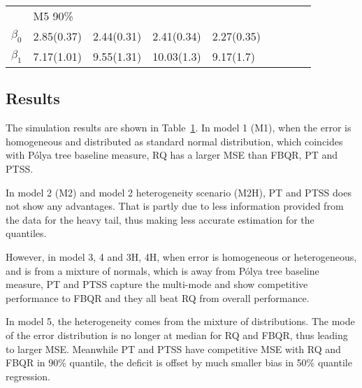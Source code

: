 \documentclass[12pt]{article}
\newcommand{\polya}{P\'{o}lya}
\begin{document}
\begin{center}
\begin{table}[h]
\begin{tabular}[tb]{cllllllll}
          & M5 90\%     &             &             &             &             &             &             &             \\
$\beta_0$ & 2.85(0.37)  & 2.44(0.31)  & 2.41(0.34)  & 2.27(0.35)  &             &             &             &             \\
$\beta_1$ & 7.17(1.01)  & 9.55(1.31)  & 10.03(1.3)  & 9.17(1.7)   &             &             &             &             \\
\hline
    \end{tabular}
    \label{ch2:tab:m1}
  \end{table}
\end{center}

\subsection{Results}
The simulation results are shown in Table~\ref{ch2:tab:m1}.
In model 1 (M1), when the error is homogeneous and distributed as standard normal distribution, which coincides with \polya{} tree baseline measure, RQ has a larger MSE than FBQR, PT and PTSS.

In model 2 (M2) and model 2 heterogeneity scenario (M2H), PT and PTSS does not show any advantages.
That is partly due to less information provided from the data for the heavy tail, thus making less accurate estimation for the quantiles.

However, in model 3, 4 and 3H, 4H, when error is homogeneous or heterogeneous, and is from a mixture of normals, which is away from \polya{} tree baseline measure,
PT and PTSS capture the multi-mode and show competitive performance to FBQR and they all beat RQ from overall performance.

In model 5, the heterogeneity comes from the mixture of distributions.
The mode of the error distribution is no longer at median for RQ and FBQR, thus leading to larger MSE.
Meanwhile PT and PTSS have competitive MSE with RQ and FBQR in 90\% quantile, the deficit is offset by much smaller bias in 50\% quantile regression.
\end{document}

